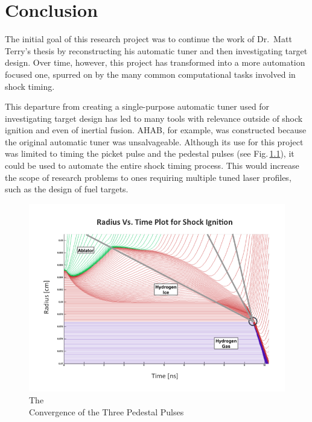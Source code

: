
\vspace{24pt}

\chapter[\textbf{Conclusion}]{Conclusion}

The initial goal of this research project was to continue the work of Dr.\ Matt Terry's thesis by reconstructing his automatic tuner and then investigating target design.  Over time, however, this project has transformed into a more automation focused one, spurred on by the many common computational tasks involved in shock timing.  

This departure from creating a single-purpose automatic tuner used for investigating target design has led to many tools with relevance outside of shock ignition and even of inertial fusion. AHAB, for example, was constructed because the original automatic tuner was unsalvageable.  Although its use for this project was limited to timing the picket pulse and the pedestal pulses (see Fig.\,\ref{fig:shockConverge}), it could be used to automate the entire shock timing process.  This would increase the scope of research problems to ones requiring multiple tuned laser profiles, such as the design of fuel targets.

\begin{figure}	
	\centering
	\includegraphics[width=.72\textwidth]{graphics/shockConverge.png} 
	\caption[Shock Convergence]{ The \\ Convergence of the Three Pedestal Pulses \\  }
	\label{fig:shockConverge}
\end{figure}

